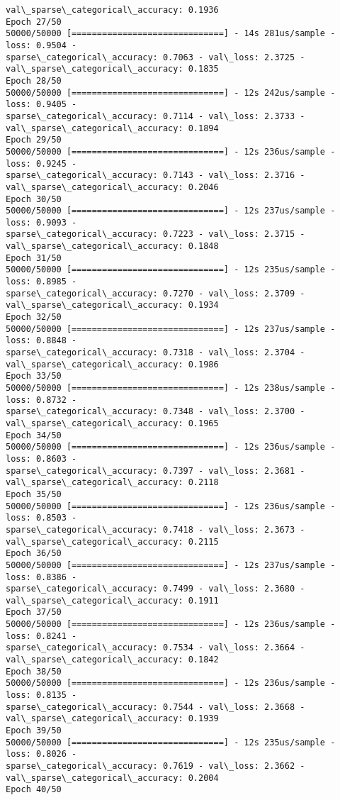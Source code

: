 \documentclass[11pt]{article}
\begin{document}
\begin{Verbatim}[commandchars=\\\{\}]
val\_sparse\_categorical\_accuracy: 0.1936
Epoch 27/50
50000/50000 [==============================] - 14s 281us/sample - loss: 0.9504 -
sparse\_categorical\_accuracy: 0.7063 - val\_loss: 2.3725 -
val\_sparse\_categorical\_accuracy: 0.1835
Epoch 28/50
50000/50000 [==============================] - 12s 242us/sample - loss: 0.9405 -
sparse\_categorical\_accuracy: 0.7114 - val\_loss: 2.3733 -
val\_sparse\_categorical\_accuracy: 0.1894
Epoch 29/50
50000/50000 [==============================] - 12s 236us/sample - loss: 0.9245 -
sparse\_categorical\_accuracy: 0.7143 - val\_loss: 2.3716 -
val\_sparse\_categorical\_accuracy: 0.2046
Epoch 30/50
50000/50000 [==============================] - 12s 237us/sample - loss: 0.9093 -
sparse\_categorical\_accuracy: 0.7223 - val\_loss: 2.3715 -
val\_sparse\_categorical\_accuracy: 0.1848
Epoch 31/50
50000/50000 [==============================] - 12s 235us/sample - loss: 0.8985 -
sparse\_categorical\_accuracy: 0.7270 - val\_loss: 2.3709 -
val\_sparse\_categorical\_accuracy: 0.1934
Epoch 32/50
50000/50000 [==============================] - 12s 237us/sample - loss: 0.8848 -
sparse\_categorical\_accuracy: 0.7318 - val\_loss: 2.3704 -
val\_sparse\_categorical\_accuracy: 0.1986
Epoch 33/50
50000/50000 [==============================] - 12s 238us/sample - loss: 0.8732 -
sparse\_categorical\_accuracy: 0.7348 - val\_loss: 2.3700 -
val\_sparse\_categorical\_accuracy: 0.1965
Epoch 34/50
50000/50000 [==============================] - 12s 236us/sample - loss: 0.8603 -
sparse\_categorical\_accuracy: 0.7397 - val\_loss: 2.3681 -
val\_sparse\_categorical\_accuracy: 0.2118
Epoch 35/50
50000/50000 [==============================] - 12s 236us/sample - loss: 0.8503 -
sparse\_categorical\_accuracy: 0.7418 - val\_loss: 2.3673 -
val\_sparse\_categorical\_accuracy: 0.2115
Epoch 36/50
50000/50000 [==============================] - 12s 237us/sample - loss: 0.8386 -
sparse\_categorical\_accuracy: 0.7499 - val\_loss: 2.3680 -
val\_sparse\_categorical\_accuracy: 0.1911
Epoch 37/50
50000/50000 [==============================] - 12s 236us/sample - loss: 0.8241 -
sparse\_categorical\_accuracy: 0.7534 - val\_loss: 2.3664 -
val\_sparse\_categorical\_accuracy: 0.1842
Epoch 38/50
50000/50000 [==============================] - 12s 236us/sample - loss: 0.8135 -
sparse\_categorical\_accuracy: 0.7544 - val\_loss: 2.3668 -
val\_sparse\_categorical\_accuracy: 0.1939
Epoch 39/50
50000/50000 [==============================] - 12s 235us/sample - loss: 0.8026 -
sparse\_categorical\_accuracy: 0.7619 - val\_loss: 2.3662 -
val\_sparse\_categorical\_accuracy: 0.2004
Epoch 40/50

\end{Verbatim}
\end{document}
